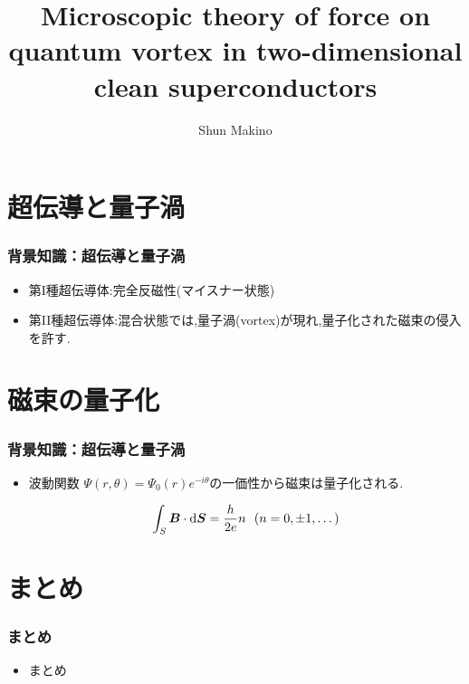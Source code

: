 \documentclass[dvipdfmx,12pt]{beamer}
\title{Microscopic theory of force on quantum vortex in two-dimensional clean superconductors}
\author{Shun Makino}
\institute{Hoge University}
\date{}
\begin{document}
\begin{frame}\frametitle{}
    \titlepage
\end{frame}


\section{超伝導と量子渦}
\begin{frame}
    \frametitle{背景知識：超伝導と量子渦}

    \begin{itemize}
        \item
              第I種超伝導体:完全反磁性(マイスナー状態)
        \item
              第II種超伝導体:混合状態では,量子渦(vortex)が現れ,量子化された磁束の侵入を許す.
    \end{itemize}
\end{frame}

\section{磁束の量子化}
\begin{frame}
    \frametitle{背景知識：超伝導と量子渦}

    \begin{itemize}
        \item
              波動関数 $\Psi(r,\theta)=\Psi_{0}(r)e^{-i\theta}$の一価性から磁束は量子化される.

              \begin{equation}
                  \int_{S} \bm{B}\cdot\mathrm{d}\bm{S} = \frac{h}{2e}n \ \ (n=0,\pm1,\dots) \notag
              \end{equation}
    \end{itemize}
\end{frame}

\section{まとめ}
\begin{frame}
    \frametitle{まとめ}

    \begin{itemize}
        \item まとめ
    \end{itemize}
\end{frame}
\end{document}
